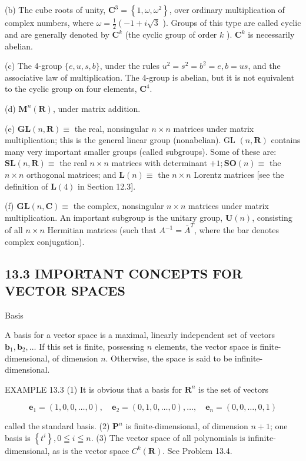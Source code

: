 \documentclass[10pt]{article}
\begin{document}
(b) The cube roots of unity, $\mathbf{C}^{3}=\left\{1, \omega, \omega^{2}\right\}$, over ordinary multiplication of complex numbers, where $\omega=\frac{1}{2}\left(-1+i \sqrt{3}\right.$ ). Groups of this type are called cyclic and are generally denoted by $\mathbf{C}^{k}$ (the cyclic group of order $k$ ). $\mathbf{C}^{k}$ is necessarily abelian.

(c) The 4-group $\{e, u, s, b\}$, under the rules $u^{2}=s^{2}=b^{2}=e, b=u s$, and the associative law of multiplication. The 4-group is abelian, but it is not equivalent to the cyclic group on four elements, $\mathbf{C}^{4}$.

(d) $\mathbf{M}^{n}(\mathbf{R})$, under matrix addition.

(e) $\mathbf{G L}(n, \mathbf{R}) \equiv$ the real, nonsingular $n \times n$ matrices under matrix multiplication; this is the general linear group (nonabelian). GL $(n, \mathbf{R})$ contains many very important smaller groups (called subgroups). Some of these are: $\mathbf{S L}(n, \mathbf{R}) \equiv$ the real $n \times n$ matrices with determinant $+1 ; \mathbf{S O}(n) \equiv$ the $n \times n$ orthogonal matrices; and $\mathbf{L}(n) \equiv$ the $n \times n$ Lorentz matrices [see the definition of $\mathbf{L}(4)$ in Section 12.3].

(f) $\mathbf{G L}(n, \mathbf{C}) \equiv$ the complex, nonsingular $n \times n$ matrices under matrix multiplication. An important subgroup is the unitary group, $\mathbf{U}(n)$, consisting of all $n \times n$ Hermitian matrices (such that $A^{-1}=\bar{A}^{T}$, where the bar denotes complex conjugation).

\subsection*{13.3 IMPORTANT CONCEPTS FOR VECTOR SPACES}
Basis

A basis for a vector space is a maximal, linearly independent set of vectors $\mathbf{b}_{1}, \mathbf{b}_{2}, \ldots$ If this set is finite, possessing $n$ elements, the vector space is finite-dimensional, of dimension $n$. Otherwise, the space is said to be infinite-dimensional.

EXAMPLE 13.3 (1) It is obvious that a basis for $\mathbf{R}^{n}$ is the set of vectors

$$
\mathbf{e}_{1}=(1,0,0, \ldots, 0), \quad \mathbf{e}_{2}=(0,1,0, \ldots, 0), \ldots, \quad \mathbf{e}_{n}=(0,0, \ldots, 0,1)
$$

called the standard basis. (2) $\mathbf{P}^{n}$ is finite-dimensional, of dimension $n+1$; one basis is $\left\{t^{i}\right\}, 0 \leqq i \leqq n$. (3) The vector space of all polynomials is infinite-dimensional, as is the vector space $C^{k}(\mathbf{R})$. See Problem 13.4.
\end{document}

